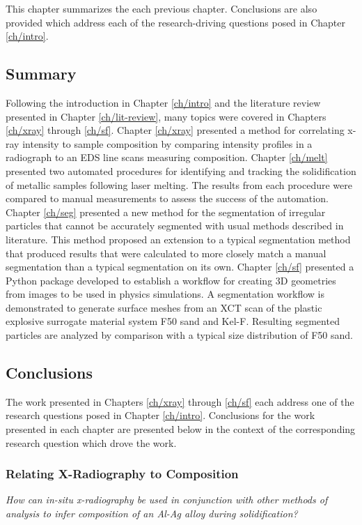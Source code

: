 This chapter summarizes the each previous chapter.
Conclusions are also provided which address each of the research-driving
questions posed in Chapter \ref{ch/intro}.

\subsection{Summary}
Following the introduction in Chapter \ref{ch/intro} and the literature
review presented in Chapter \ref{ch/lit-review}, many topics were
covered in Chapters \ref{ch/xray} through \ref{ch/sf}.
Chapter \ref{ch/xray}
presented a method for correlating x-ray intensity to sample composition
by comparing intensity profiles in a radiograph to an EDS line scans
measuring composition.
Chapter \ref{ch/melt} presented two automated procedures for identifying
and tracking the solidification of metallic samples following
laser melting. The results from each procedure were compared to manual
measurements to assess the success of the automation.
Chapter \ref{ch/seg} presented a new method for the segmentation of
irregular particles that cannot be accurately segmented
with usual methods described in literature. This method proposed an
extension to a typical segmentation method that produced results that
were calculated to more closely match a manual segmentation than a
typical segmentation on its own.
Chapter \ref{ch/sf} presented a Python package developed to establish
a workflow for creating 3D geometries from images to be used in physics
simulations. A segmentation workflow is demonstrated to generate surface
meshes from an XCT scan of the plastic explosive surrogate material
system F50 sand and Kel-F. Resulting segmented particles are analyzed
by comparison with a typical size distribution of F50 sand.

\subsection{Conclusions}
The work presented in Chapters \ref{ch/xray} through \ref{ch/sf} each
address one of the research questions posed in Chapter \ref{ch/intro}.
Conclusions for the work presented in each chapter are presented below in
the context of the corresponding research question which drove the work.

\subsubsection{Relating X-Radiography to Composition}
\noindent \textit{
    How can in-situ x-radiography be used in conjunction with
    other methods of analysis to infer composition of an Al-Ag alloy during
    solidification?
}

